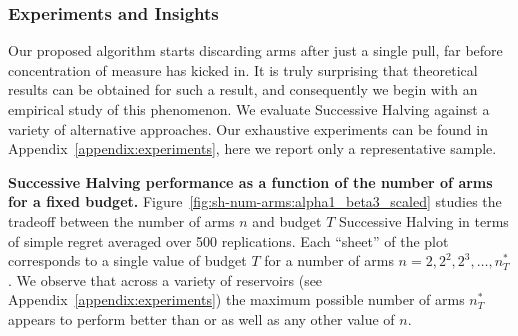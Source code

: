 \subsubsection{Experiments and Insights}\label{fb-experiments}
Our proposed algorithm starts discarding arms after just a single pull, far before concentration of measure has kicked in. 
It is truly surprising that theoretical results can be obtained for such a result, and consequently we begin with an empirical study of this phenomenon. 
We evaluate Successive Halving against a variety of alternative approaches. Our exhaustive experiments can be found in Appendix~\ref{appendix:experiments}, here we report only a representative sample.

\textbf{Successive Halving performance as a function of the number of arms for a fixed budget.}
Figure~\ref{fig:sh-num-arms:alpha1_beta3_scaled} studies the tradeoff between the number of arms $n$ and budget $T$ Successive Halving in terms of simple regret averaged over 500 replications.
Each ``sheet'' of the plot corresponds to a single value of budget $T$ for a number of arms $n=2,2^2,2^3,\dots,n^*_T$.
We observe that across a variety of reservoirs (see Appendix~\ref{appendix:experiments}) the maximum possible number of arms $n^*_T$ appears to perform better than or as well as any other value of $n$.


